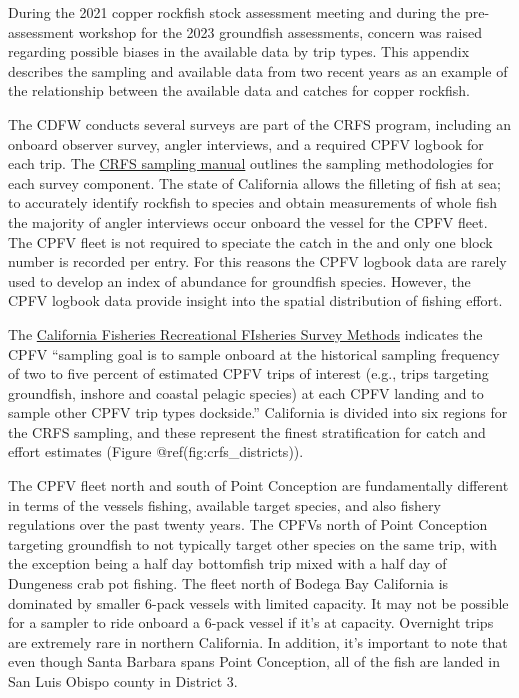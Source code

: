 \documentclass[11pt,
  english,
  letterpaper,
]{article}
\begin{document}
During the 2021 copper rockfish stock assessment meeting and during the pre-assessment workshop for the 2023 groundfish assessments, concern was raised regarding possible biases in the available data by trip types. This appendix describes the sampling and available data from two recent years as an example of the relationship between the available data and catches for copper rockfish.

The CDFW conducts several surveys are part of the CRFS program, including an onboard observer survey, angler interviews, and a required CPFV logbook for each trip. The \href{https://nrm.dfg.ca.gov/FileHandler.ashx?DocumentID=62348\&inline}{CRFS sampling manual} outlines the sampling methodologies for each survey component. The state of California allows the filleting of fish at sea; to accurately identify rockfish to species and obtain measurements of whole fish the majority of angler interviews occur onboard the vessel for the CPFV fleet. The CPFV fleet is not required to speciate the catch in the and only one block number is recorded per entry. For this reasons the CPFV logbook data are rarely used to develop an index of abundance for groundfish species. However, the CPFV logbook data provide insight into the spatial distribution of fishing effort.

The \href{https://nrm.dfg.ca.gov/FileHandler.ashx?DocumentID=36136\&inline}{California Fisheries Recreational FIsheries Survey Methods} indicates the CPFV ``sampling goal is to sample onboard at the historical sampling frequency of two to five percent of estimated CPFV trips of interest (e.g., trips targeting groundfish, inshore and coastal pelagic species) at each CPFV landing and to sample other CPFV trip types dockside.'' California is divided into six regions for the CRFS sampling, and these represent the finest stratification for catch and effort estimates (Figure @ref(fig:crfs\_districts)).

The CPFV fleet north and south of Point Conception are fundamentally different in terms of the vessels fishing, available target species, and also fishery regulations over the past twenty years. The CPFVs north of Point Conception targeting groundfish to not typically target other species on the same trip, with the exception being a half day bottomfish trip mixed with a half day of Dungeness crab pot fishing. The fleet north of Bodega Bay California is dominated by smaller 6-pack vessels with limited capacity. It may not be possible for a sampler to ride onboard a 6-pack vessel if it's at capacity. Overnight trips are extremely rare in northern California. In addition, it's important to note that even though Santa Barbara spans Point Conception, all of the fish are landed in San Luis Obispo county in District 3.
\end{document}
